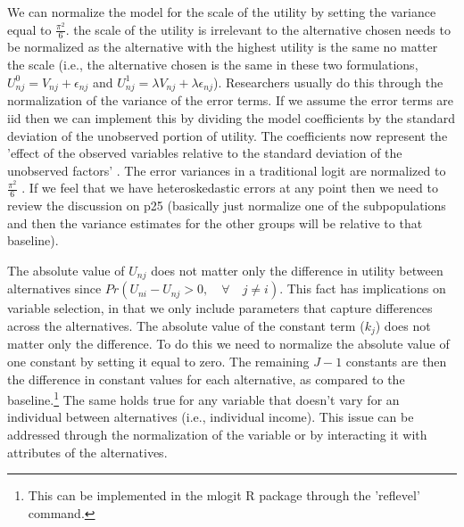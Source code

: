 \documentclass[10pt]{amsart}
\begin{document}
We can normalize the model for the scale of the utility by setting the variance equal to $\frac{\pi^2}{6}$. 
the scale of the utility is irrelevant to the alternative chosen  needs to be normalized as the alternative with the highest utility is the same no matter the scale (i.e., the alternative chosen is the same in these two formulations, $U^0_{nj} = V_{nj} + \epsilon_{nj}$ and $U^1_{nj} = \lambda V_{nj} + \lambda \epsilon_{nj}$).
Researchers usually do this through the normalization of the variance of the error terms. 
If we assume the error terms are iid then we can implement this by dividing the model coefficients by the standard deviation of the unobserved portion of utility.
The coefficients now represent the 'effect of the observed variables relative to the standard deviation of the unobserved factors' \parencite[24]{train:2009aa}.  
The error variances in a traditional logit are normalized to $\frac{\pi^2}{6}$ \parencite{train:2009aa}. 
If we feel that we have heteroskedastic errors at any point then we need to review the discussion on p25 (basically just normalize one of the subpopulations and then the variance estimates for the other groups will be relative to that baseline). 

The absolute value of $U_{nj}$ does not matter only the difference in utility between alternatives since $Pr(U_{ni} -U_{nj} > 0, \quad \forall \quad j \neq i)$.
This fact has implications on variable selection, in that we only include parameters that capture differences across the alternatives. 
The absolute value of the constant term ($k_{j}$) does not matter only the difference.
To do this we need to normalize the absolute value of one constant by setting it equal to zero.
The remaining $J-1$ constants are then the difference in constant values for each alternative, as compared to the baseline.\footnote{This can be implemented in the mlogit R package through the 'reflevel' command.}    
The same holds true for any variable that doesn't vary for an individual between alternatives (i.e., individual income).
This issue can be addressed through the normalization of the variable or by interacting it with attributes of the alternatives. 
\end{document}
